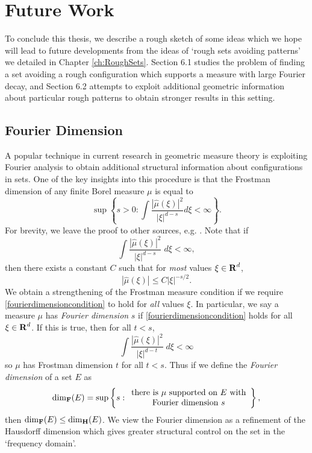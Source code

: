 
\chapter{Future Work}
\label{ch:Conclusions}

To conclude this thesis, we describe a rough sketch of some ideas which we hope will lead to future developments from the ideas of `rough sets avoiding patterns' we detailed in Chapter \ref{ch:RoughSets}. Section 6.1 studies the problem of finding a set avoiding a rough configuration which supports a measure with large Fourier decay, and Section 6.2 attempts to exploit additional geometric information about particular rough patterns to obtain stronger results in this setting.

\section{Fourier Dimension}

A popular technique in current research in geometric measure theory is exploiting Fourier analysis to obtain additional structural information about configurations in sets. One of the key insights into this procedure is that the Frostman dimension of any finite Borel measure $\mu$ is equal to
%
\[ \sup \left\{ s > 0 : \int \frac{|\widehat{\mu}(\xi)|^2}{|\xi|^{d-s}} d\xi < \infty \right\}. \]
%
For brevity, we leave the proof to other sources, e.g. \cite[Section 3.5]{Matilla}. Note that if
%
\[ \int \frac{|\widehat{\mu}(\xi)|^2}{|\xi|^{d-s}}\; d\xi < \infty, \]
%
then there exists a constant $C$ such that for \emph{most} values $\xi \in \operatorname{\mathbf{R}}^d$,
%
\begin{equation} \label{fourierdimensioncondition}
    |\widehat{\mu}(\xi)| \leq C |\xi|^{-s/2}.
\end{equation}
%
We obtain a strengthening of the Frostman measure condition if we require \eqref{fourierdimensioncondition} to hold for \emph{all} values $\xi$. In particular, we say a measure $\mu$ has \emph{Fourier dimension} $s$ if \eqref{fourierdimensioncondition} holds for all $\xi \in \operatorname{\mathbf{R}}^d$. If this is true, then for all $t < s$,
%
\[ \int \frac{|\widehat{\mu}(\xi)|^2}{|\xi|^{d-t}}\; d\xi < \infty \]
%
so $\mu$ has Frostman dimension $t$ for all $t < s$. Thus if we define the \emph{Fourier dimension} of a set $E$ as
%
\[ \operatorname{\dim_{\mathbf{F}}}(E) = \sup \left\{ s : \begin{array}{c} \text{there is $\mu$ supported on $E$ with}\\ \text{Fourier dimension $s$} \end{array} \right\}, \]
%
then $\operatorname{\dim_{\mathbf{F}}}(E) \leq \operatorname{\dim_{\mathbf{H}}}(E)$. We view the Fourier dimension as a refinement of the Hausdorff dimension which gives greater structural control on the set in the `frequency domain'.

